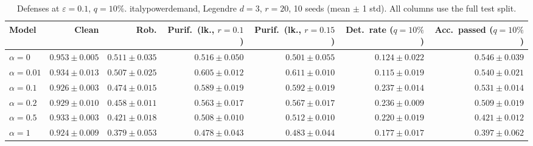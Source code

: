 \begin{table}[htbp]
  \centering
  \small
  \begin{tabular}{@{}lrrrrrr@{}}
    \toprule
    Model & Clean & Rob. & Purif.\ (lk., $r{=}0.1$) & Purif.\ (lk., $r{=}0.15$) & Det.\ rate ($q{=}10\%$) & Acc.\ passed ($q{=}10\%$) \\
    \midrule
    $\alpha{=}0$ & $\mathbf{0.953 \pm 0.005}$ & $\mathbf{0.511 \pm 0.035}$ & $0.516 \pm 0.050$ & $0.501 \pm 0.055$ & $0.124 \pm 0.022$ & $\mathbf{0.546 \pm 0.039}$ \\
    $\alpha{=}0.01$ & $0.934 \pm 0.013$ & $0.507 \pm 0.025$ & $\mathbf{0.605 \pm 0.012}$ & $\mathbf{0.611 \pm 0.010}$ & $0.115 \pm 0.019$ & $0.540 \pm 0.021$ \\
    $\alpha{=}0.1$ & $0.926 \pm 0.003$ & $0.474 \pm 0.015$ & $0.589 \pm 0.019$ & $0.592 \pm 0.019$ & $\mathbf{0.237 \pm 0.014}$ & $0.531 \pm 0.014$ \\
    $\alpha{=}0.2$ & $0.929 \pm 0.010$ & $0.458 \pm 0.011$ & $0.563 \pm 0.017$ & $0.567 \pm 0.017$ & $0.236 \pm 0.009$ & $0.509 \pm 0.019$ \\
    $\alpha{=}0.5$ & $0.933 \pm 0.003$ & $0.421 \pm 0.018$ & $0.508 \pm 0.010$ & $0.512 \pm 0.010$ & $0.220 \pm 0.019$ & $0.421 \pm 0.012$ \\
    $\alpha{=}1$ & $0.924 \pm 0.009$ & $0.379 \pm 0.053$ & $0.478 \pm 0.043$ & $0.483 \pm 0.044$ & $0.177 \pm 0.017$ & $0.397 \pm 0.062$ \\
    \bottomrule
  \end{tabular}
  \caption{Defenses at $\varepsilon=0.1$, $q{=}10\%$. italypowerdemand, Legendre $d{=}3$, $r{=}20$, 10 seeds (mean $\pm$ 1 std). All columns use the full test split.}
  \label{tab:italypowerdemand_models_r20_eps0.1}
\end{table}
